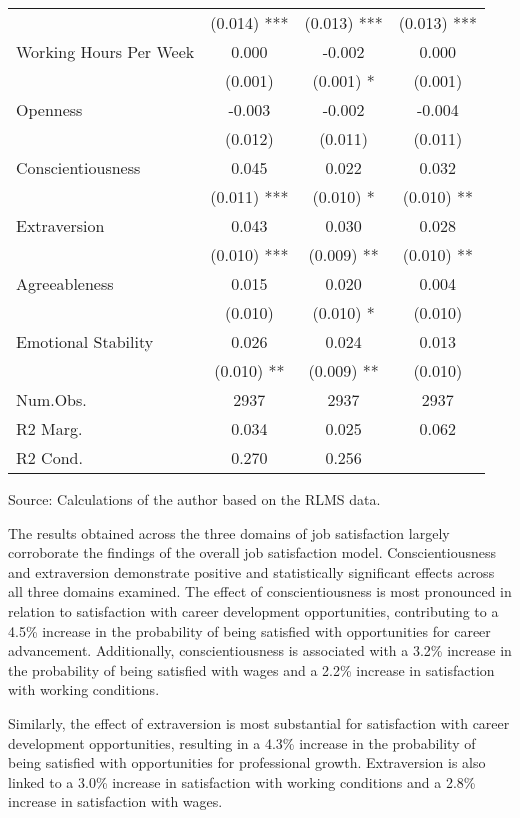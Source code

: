 \documentclass[
]{interact}
\begin{document}
\begin{table}
{\begin{tabular*}{\linewidth}{@{\extracolsep{\fill}}lccc}
 & (0.014) *** & (0.013) *** & (0.013) *** \\ 
Working Hours Per Week & 0.000 & -0.002 & 0.000 \\ 
 & (0.001) & (0.001) * & (0.001) \\ 
Openness & -0.003 & -0.002 & -0.004 \\ 
 & (0.012) & (0.011) & (0.011) \\ 
Conscientiousness & 0.045 & 0.022 & 0.032 \\ 
 & (0.011) *** & (0.010) * & (0.010) ** \\ 
Extraversion & 0.043 & 0.030 & 0.028 \\ 
 & (0.010) *** & (0.009) ** & (0.010) ** \\ 
Agreeableness & 0.015 & 0.020 & 0.004 \\ 
 & (0.010) & (0.010) * & (0.010) \\ 
Emotional Stability & 0.026 & 0.024 & 0.013 \\ 
{} & {(0.010) **} & {(0.009) **} & {(0.010)} \\ 
Num.Obs. & 2937 & 2937 & 2937 \\ 
R2 Marg. & 0.034 & 0.025 & 0.062 \\ 
R2 Cond. & 0.270 & 0.256 &  \\ 
\bottomrule
\end{tabular*}
\begin{minipage}{\linewidth}
Source: Calculations of the author based on the RLMS data.\\
\end{minipage}

}

\end{table}%

The results obtained across the three domains of job satisfaction
largely corroborate the findings of the overall job satisfaction model.
Conscientiousness and extraversion demonstrate positive and
statistically significant effects across all three domains examined. The
effect of conscientiousness is most pronounced in relation to
satisfaction with career development opportunities, contributing to a
4.5\% increase in the probability of being satisfied with opportunities
for career advancement. Additionally, conscientiousness is associated
with a 3.2\% increase in the probability of being satisfied with wages
and a 2.2\% increase in satisfaction with working conditions.

Similarly, the effect of extraversion is most substantial for
satisfaction with career development opportunities, resulting in a 4.3\%
increase in the probability of being satisfied with opportunities for
professional growth. Extraversion is also linked to a 3.0\% increase in
satisfaction with working conditions and a 2.8\% increase in
satisfaction with wages.
\end{document}
